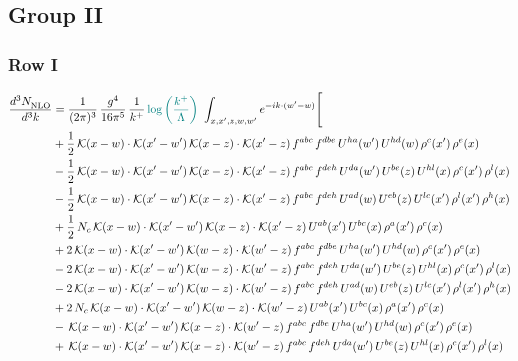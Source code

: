 \documentclass[9pt]{article}
\numberwithin{equation}{section}
\begin{document}
\subsection{Group II}
\subsubsection{Row I}
\begin{align}
 \frac{d^{3}N_{\rm NLO}^{\rm}}{d^{3}k}  & = \frac{1}{(2\pi)^{3}}\,\frac{g^{4}}{16\pi^{5}}\,\frac{1}{k^{+}}\,{\color{teal}\log{\left(\frac{k^{+}}{\Lambda}\right)}}\,\,\int_{x,x',z,w,w'}e^{-ik\cdot(w'-w)}\Bigg[\notag\\
&+\frac{1}{2}\,\mathcal{K}(x-w)\cdot\mathcal{K}(x'-w')\,\mathcal{K}(x-z)\cdot\mathcal{K}(x'-z)\,f^{abc}\,f^{dbe}\,U^{ha}(w')\,U^{hd}(w)\,\rho^{c}(x')\,\rho^{e}(x)\notag\\
&-\frac{1}{2}\,\mathcal{K}(x-w)\cdot\mathcal{K}(x'-w')\,\mathcal{K}(x-z)\cdot\mathcal{K}(x'-z)\,f^{abc}\,f^{deh}\,U^{da}(w')\,U^{be}(z)\,U^{hl}(x)\,\rho^{c}(x')\,\rho^{l}(x)\notag\\
&-\frac{1}{2}\,\mathcal{K}(x-w)\cdot\mathcal{K}(x'-w')\,\mathcal{K}(x-z)\cdot\mathcal{K}(x'-z)\,f^{abc}\,f^{deh}\,U^{ad}(w)\,U^{eb}(z)\,U^{lc}(x')\,\rho^{l}(x')\,\rho^{h}(x)\notag\\
&+\frac{1}{2}\,N_{c}\,\mathcal{K}(x-w)\cdot\mathcal{K}(x'-w')\,\mathcal{K}(x-z)\cdot\mathcal{K}(x'-z)\,U^{ab}(x')\,U^{bc}(x)\,\rho^{a}(x')\,\rho^{c}(x)\notag\\
&+2\,\mathcal{K}(x-w)\cdot\mathcal{K}(x'-w')\,\mathcal{K}(w-z)\cdot\mathcal{K}(w'-z)\,f^{abc}\,f^{dbe}\,U^{ha}(w')\,U^{hd}(w)\,\rho^{c}(x')\,\rho^{e}(x)\notag\\
&-2\,\mathcal{K}(x-w)\cdot\mathcal{K}(x'-w')\,\mathcal{K}(w-z)\cdot\mathcal{K}(w'-z)\,f^{abc}\,f^{deh}\,U^{da}(w')\,U^{be}(z)\,U^{hl}(x)\,\rho^{c}(x')\,\rho^{l}(x)\notag\\
&-2\,\mathcal{K}(x-w)\cdot\mathcal{K}(x'-w')\,\mathcal{K}(w-z)\cdot\mathcal{K}(w'-z)\,f^{abc}\,f^{deh}\,U^{ad}(w)\,U^{eb}(z)\,U^{lc}(x')\,\rho^{l}(x')\,\rho^{h}(x)\notag\\
&+2\,N_{c}\,\mathcal{K}(x-w)\cdot\mathcal{K}(x'-w')\,\mathcal{K}(w-z)\cdot\mathcal{K}(w'-z)\,U^{ab}(x')\,U^{bc}(x)\,\rho^{a}(x')\,\rho^{c}(x)\notag\\
&-\,\mathcal{K}(x-w)\cdot\mathcal{K}(x'-w')\,\mathcal{K}(x-z)\cdot\mathcal{K}(w'-z)\,f^{abc}\,f^{dbe}\,U^{ha}(w')\,U^{hd}(w)\,\rho^{c}(x')\,\rho^{e}(x)\notag\\
&+\,\mathcal{K}(x-w)\cdot\mathcal{K}(x'-w')\,\mathcal{K}(x-z)\cdot\mathcal{K}(w'-z)\,f^{abc}\,f^{deh}\,U^{da}(w')\,U^{be}(z)\,U^{hl}(x)\,\rho^{c}(x')\,\rho^{l}(x)\notag\\

\end{align}
\end{document}
